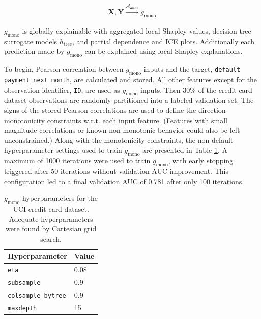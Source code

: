 \documentclass[sigconf, review]{acmart}
\begin{document}
\begin{equation}
\label{eq:cc_training}
\begin{aligned}
\mathbf{X}, \mathbf{Y} \xrightarrow{\mathcal{A_{\text{mono}}}} g_{\text{mono}}
\end{aligned}
\end{equation}

\noindent$g_{\text{mono}}$ is globally explainable with aggregated local Shapley values, decision tree surrogate models $h_{\text{tree}}$, and partial dependence and ICE plots. Additionally each prediction made by $g_{\text{mono}}$ can be explained using local Shapley explanations. 

To begin, Pearson correlation between $g_{\text{mono}}$ inputs and the target, \texttt{default payment next month}, are calculated and stored. All other features except for the observation identifier, \texttt{ID}, are used as $g_{\text{mono}}$ inputs. Then 30\% of the credit card dataset observations are randomly partitioned into a labeled validation set. The signs of the stored Pearson correlations are used to define the direction monotonicity constraints w.r.t. each input feature. (Features with small magnitude correlations or known non-monotonic behavior could also be left unconstrained.) Along with the monotonicity constraints, the non-default hyperparameter settings used to train $g_{\text{mono}}$ are presented in Table \ref{tab:mono_gbm}. A maximum of 1000 iterations were used to train $g_{\text{mono}}$, with early stopping triggered after 50 iterations without validation AUC improvement. This configuration led to a final validation AUC of 0.781 after only 100 iterations. 

\begin{table}[ht]
	\centering
	\caption{$g_{\text{mono}}$ hyperparameters for the UCI credit card dataset. Adequate hyperparameters were found by Cartesian grid search.}
	\begin{tabular}{ | p{3.5cm} | p{1.2cm} | }
	\hline
	Hyperparameter & Value \\ 
	\hline
	\texttt{eta} & 0.08 \\
	\hline	
	\texttt{subsample} & 0.9 \\
	\hline	
	\texttt{colsample\_bytree} & 0.9 \\
	\hline
	\texttt{maxdepth} & 15 \\	
	\hline
	\end{tabular}
	\label{tab:mono_gbm}
\end{table}	 
\end{document}
